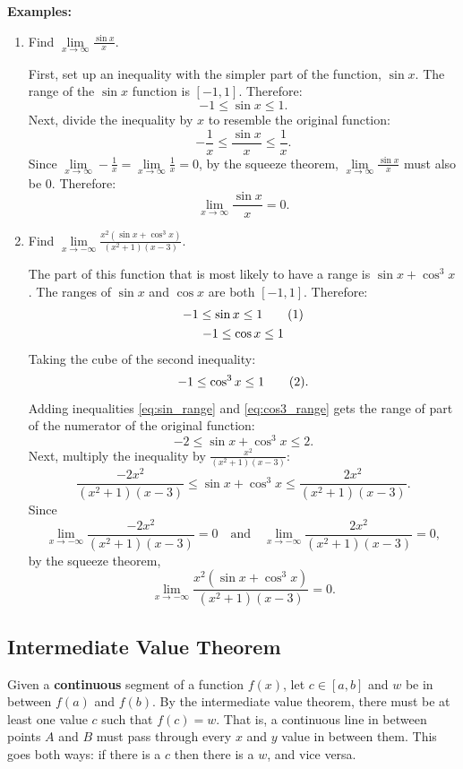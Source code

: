 \documentclass[12pt]{article}
\newcommand{\numberthis}{\addtocounter{equation}{1}\tag{\theequation}}
\begin{document}
\noindent \textbf{Examples:}
\begin{enumerate}
    \item Find $\lim \limits_{x \to \infty} \frac{\sin x}{x}$.

    First, set up an inequality with the simpler part of the function, $\sin x$. The range of the $\sin x$ function is $[-1, 1]$. Therefore:
    \[ -1 \le \sin x \le 1. \]
    Next, divide the inequality by $x$ to resemble the original function:
    \[ -\frac{1}{x} \le \frac{\sin x}{x} \le \frac{1}{x}. \]
    Since $\lim \limits_{x \to \infty} -\frac{1}{x} = \lim \limits_{x \to \infty} \frac{1}{x} = 0$, by the squeeze theorem, $\lim \limits_{x \to \infty} \frac{\sin x}{x}$ must also be $0$. Therefore:
    \[ \lim \limits_{x \to \infty} \frac{\sin x}{x} = 0. \]

    \item Find $\lim \limits_{x \to -\infty} \frac{x^2 (\sin x + \cos^3 x)}{(x^2 + 1)(x - 3)}$.

	The part of this function that is most likely to have a range is $\sin x + \cos^3 x$. The ranges of $\sin x$ and $\cos x$ are both $[-1, 1]$. Therefore:
	\begin{gather*}
		-1 \le \sin x \le 1 \numberthis{\label{eq:sin_range}} \\
		-1 \le \cos x \le 1
	\end{gather*}
	Taking the cube of the second inequality:
	\[ -1 \le \cos^3 x \le 1 \numberthis{\label{eq:cos3_range}}. \]
	Adding inequalities \eqref{eq:sin_range} and \eqref{eq:cos3_range} gets the range of part of the numerator of the original function:
	\[ -2 \le \sin x + \cos^3 x \le 2. \]
	Next, multiply the inequality by $\frac{x^2}{(x^2 + 1)(x - 3)}$:
	\[ \frac{-2 x^2}{(x^2 + 1)(x - 3)} \le \sin x + \cos^3 x \le \frac{2 x^2}{(x^2 + 1)(x - 3)}. \]
	Since
	\[ \lim_{x \to -\infty}\frac{-2 x^2}{(x^2 + 1)(x - 3)} = 0 \quad \text{and} \quad \lim_{x \to -\infty}\frac{2 x^2}{(x^2 + 1)(x - 3)} = 0, \]
	by the squeeze theorem,
	\[ \lim_{x \to -\infty} \frac{x^2 (\sin x + \cos^3 x)}{(x^2 + 1)(x - 3)} = 0. \]
\end{enumerate}

\subsection{Intermediate Value Theorem}
Given a \textbf{continuous} segment of a function $f(x)$, let $c \in [a, b]$ and $w$ be in between $f(a)$ and $f(b)$. By the intermediate value theorem, there must be at least one value $c$ such that $f(c) = w$. That is, a continuous line in between points $A$ and $B$ must pass through every $x$ and $y$ value in between them. This goes both ways: if there is a $c$ then there is a $w$, and vice versa.
\end{document}
